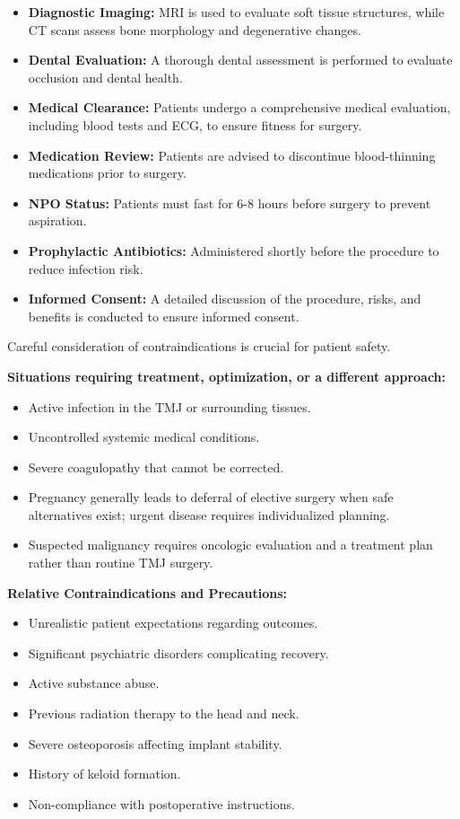 \begin{itemize}
  \item \textbf{Diagnostic Imaging:} MRI is used to evaluate soft tissue structures, while CT scans assess bone morphology and degenerative changes.
  
  \item \textbf{Dental Evaluation:} A thorough dental assessment is performed to evaluate occlusion and dental health.

  \item \textbf{Medical Clearance:} Patients undergo a comprehensive medical evaluation, including blood tests and ECG, to ensure fitness for surgery.

  \item \textbf{Medication Review:} Patients are advised to discontinue blood-thinning medications prior to surgery.

  \item \textbf{NPO Status:} Patients must fast for 6-8 hours before surgery to prevent aspiration.

  \item \textbf{Prophylactic Antibiotics:} Administered shortly before the procedure to reduce infection risk.

  \item \textbf{Informed Consent:} A detailed discussion of the procedure, risks, and benefits is conducted to ensure informed consent.
\end{itemize}

Careful consideration of contraindications is crucial for patient safety.

\textbf{Situations requiring treatment, optimization, or a different approach:}
\begin{itemize}
  \item Active infection in the TMJ or surrounding tissues.
  \item Uncontrolled systemic medical conditions.
  \item Severe coagulopathy that cannot be corrected.
  \item Pregnancy generally leads to deferral of elective surgery when safe alternatives exist; urgent disease requires individualized planning.
  \item Suspected malignancy requires oncologic evaluation and a treatment plan rather than routine TMJ surgery.
\end{itemize}

\textbf{Relative Contraindications and Precautions:}
\begin{itemize}
  \item Unrealistic patient expectations regarding outcomes.
  \item Significant psychiatric disorders complicating recovery.
  \item Active substance abuse.
  \item Previous radiation therapy to the head and neck.
  \item Severe osteoporosis affecting implant stability.
  \item History of keloid formation.
  \item Non-compliance with postoperative instructions.
\end{itemize}


